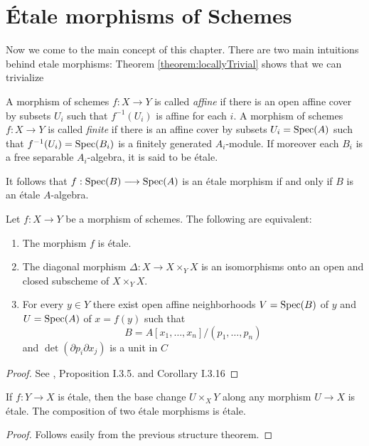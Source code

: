 \section{\'Etale morphisms of Schemes}
Now we come to the main concept of this chapter. There are two main intuitions behind etale morphisms: Theorem \ref{theorem:locallyTrivial} shows that we can trivialize

\begin{reminder}
	A morphism of schemes $f: X \to Y$ is called \textit{affine} if there is an open affine cover by subsets $U_i$ such that $f^{-1}(U_i)$ is affine for each $i$. A morphism of schemes $f: X \to Y$ is called \textit{finite} if there is an affine cover by subsets $U_i = \operatorname{Spec}(A)$ such that $f^{-1}(U_i) = \operatorname{Spec}(B_i)$ is a finitely generated $A_i$-module. If moreover each $B_i$ is a free separable $A_i$-algebra, it is said to be \'etale.
\end{reminder}

It follows that $f: \operatorname{Spec}(B) \longrightarrow \operatorname{Spec}(A)$ is an \'etale morphism if and only if $B$ is an \'etale $A$-algebra.

\begin{theorem}
	Let $f \colon X \to Y$ be a morphism of schemes. The following are equivalent:
	\begin{enumerate}
		\item The morphism $f$ is \'etale.
		\item The diagonal morphism $\Delta \colon X \to X \times_Y X$ is an isomorphisms onto an open and closed subscheme of $X \times_Y X$.
		\item For every $y \in Y$ there exist open affine neighborhoods $V = \operatorname{Spec}(B)$ of $y$ and $U = \operatorname{Spec}(A)$ of $x = f(y)$ such that
		      \[
			      B = A[x_1, \dots, x_n]/(p_1, \dots, p_n)
		      \]
		      and $\det(\partial p_i \partial x_j)$ is a unit in $C$
	\end{enumerate}
\end{theorem}

\begin{proof}
	See \cite{milneEC}, Proposition I.3.5. and Corollary I.3.16
\end{proof}

\begin{lemma}\label{lemma:etale_site}
	If $f: Y \to X$ is \'etale, then the base change $U \times_X Y$ along any morphism $U \to X$ is \'etale. The composition of two \'etale morphisms is \'etale.
\end{lemma}

\begin{proof}
	Follows easily from the previous structure theorem.
\end{proof}

